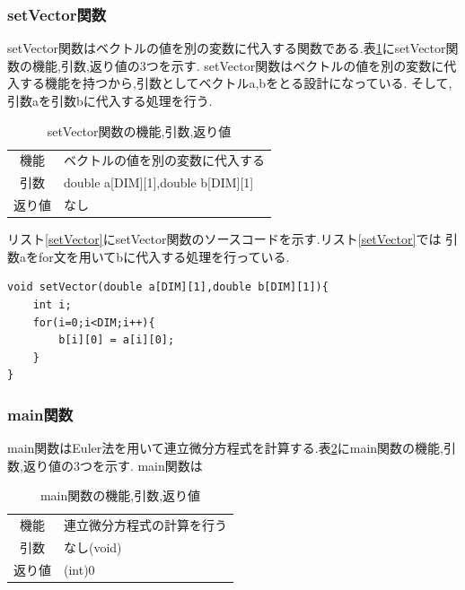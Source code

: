 \documentclass[a4j]{jarticle}
\begin{document}
      \subsubsection{setVector関数}
      setVector関数はベクトルの値を別の変数に代入する関数である.表\ref{setVectortable}にsetVector関数の機能,引数,返り値の3つを示す.
      setVector関数はベクトルの値を別の変数に代入する機能を持つから,引数としてベクトルa,bをとる設計になっている.
      そして,引数aを引数bに代入する処理を行う.
        \begin{table}[H]
          \caption{setVector関数の機能,引数,返り値}
          \label{setVectortable}
          \begin{center}
              \begin{tabular}{c|l}\hline
                機能 & ベクトルの値を別の変数に代入する\\
                引数 & double a[DIM][1],double b[DIM][1]\\
                返り値 & なし\\ \hline
              \end{tabular}
          \end{center}
          \end{table}

          リスト\ref{setVector}にsetVector関数のソースコードを示す.リスト\ref{setVector}では
        引数aをfor文を用いてbに代入する処理を行っている.
    \begin{lstlisting}[basicstyle=\ttfamily\footnotesize, frame=single,label=setVector,caption=setVector関数のコード]
void setVector(double a[DIM][1],double b[DIM][1]){
    int i;
    for(i=0;i<DIM;i++){
        b[i][0] = a[i][0];
    }
}
    \end{lstlisting}


      \subsubsection{main関数}
      main関数はEuler法を用いて連立微分方程式を計算する.表\ref{maintable}にmain関数の機能,引数,返り値の3つを示す.
      main関数は
        \begin{table}[H]
          \caption{main関数の機能,引数,返り値}
          \label{maintable}
          \begin{center}
              \begin{tabular}{c|l}\hline
                機能 & 連立微分方程式の計算を行う\\
                引数 & なし(void)\\
                返り値 & (int)0\\ \hline
              \end{tabular}
          \end{center}
          \end{table}
\end{document}

